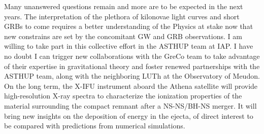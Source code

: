 \documentclass[11pt,onecolumn]{article}
\makeatletter
\newcommand{\gw}{GW\xspace}
\newcommand{\grb}{GRB\xspace}
\newcommand{\grbs}{GRBs\xspace}
\newcommand*{\ns}{NS\@\xspace}
\newcommand*{\bh}{BH\@\xspace}
\makeatother
\begin{document}
Many unanswered questions remain and more are to be expected in the next years. The interpretation of the plethora of kilonovae light curves and short \grbs to come requires a better understanding of the Physics at stake now that new constrains are set by the concomitant \gw and \grb observations. I am willing to take part in this collective effort in the ASTHUP team at IAP. I have no doubt I can trigger new collaborations with the GreCo team to take advantage of their expertise in gravitational theory and foster renewed partnerships with the ASTHUP team, along with the neighboring LUTh at the Observatory of Meudon. On the long term, the X-IFU instrument aboard the Athena satellite will provide high-resolution X-ray spectra to characterize the ionization properties of the material surrounding the compact remnant after a \ns-\ns/\bh-\ns merger. It will bring new insights on the deposition of energy in the ejecta, of direct interest to be compared with predictions from numerical simulations.\\


\end{document}
